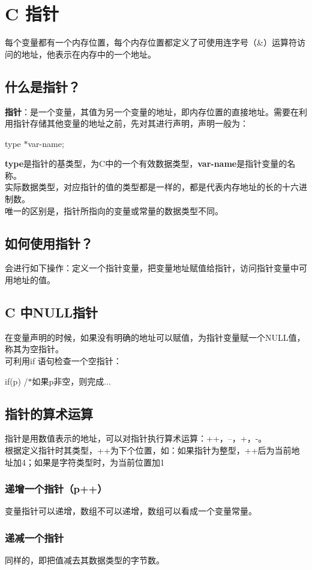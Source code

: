 \documentclass[UTF8]{ctexart}
\begin{document}
			\clearpage
			\section{C 指针}
			每个变量都有一个内存位置，每个内存位置都定义了可使用连字号（\&）运算符访问的地址，他表示在内存中的一个地址。
			\subsection{什么是指针？}
			\textbf{指针}：是一个变量，其值为另一个变量的地址，即内存位置的直接地址。需要在利用指针存储其他变量的地址之前，先对其进行声明，声明一般为：\begin{framed}
				type $*$var-name;
			\end{framed}
			\textbf{type}是指针的基类型，为C中的一个有效数据类型，\textbf{var-name}是指针变量的名称。\\实际数据类型，对应指针的值的类型都是一样的，都是代表内存地址的长的十六进制数。\\唯一的区别是，指针所指向的变量或常量的数据类型不同。
			\subsection{如何使用指针？}
			会进行如下操作：定义一个指针变量，把变量地址赋值给指针，访问指针变量中可用地址的值。
			\subsection{C 中NULL指针}
			在变量声明的时候，如果没有明确的地址可以赋值，为指针变量赋一个NULL值，称其为空指针。\\
			可利用if 语句检查一个空指针：\begin{framed}
				if(p) /$*$如果p非空，则完成...
			\end{framed}
			\subsection{指针的算术运算}
			指针是用数值表示的地址，可以对指针执行算术运算：++，--，+，-。\\
			根据定义指针时其类型，++为下个位置，如：如果指针为整型，++后为当前地址加4；如果是字符类型时，为当前位置加1
			\subsubsection{递增一个指针（p++）}
			变量指针可以递增，数组不可以递增，数组可以看成一个变量常量。
			\subsubsection{递减一个指针}
			同样的，即把值减去其数据类型的字节数。
\end{document}
